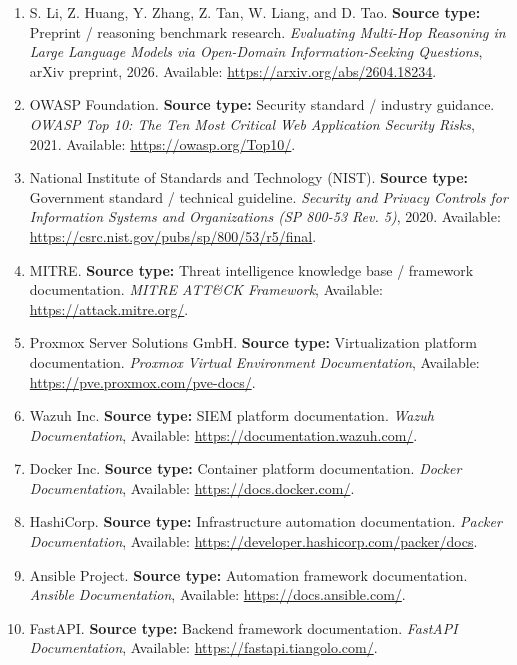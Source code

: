 \begin{enumerate}
\item
S. Li, Z. Huang, Y. Zhang, Z. Tan, W. Liang, and D. Tao.
\textbf{Source type:} Preprint / reasoning benchmark research.
\textit{Evaluating Multi-Hop Reasoning in Large Language Models via Open-Domain Information-Seeking Questions},
arXiv preprint, 2026.
Available: \url{https://arxiv.org/abs/2604.18234}.

\item
OWASP Foundation.
\textbf{Source type:} Security standard / industry guidance.
\textit{OWASP Top 10: The Ten Most Critical Web Application Security Risks},
2021.
Available: \url{https://owasp.org/Top10/}.

\item
National Institute of Standards and Technology (NIST).
\textbf{Source type:} Government standard / technical guideline.
\textit{Security and Privacy Controls for Information Systems and Organizations (SP 800-53 Rev. 5)},
2020.
Available: \url{https://csrc.nist.gov/pubs/sp/800/53/r5/final}.

\item
MITRE.
\textbf{Source type:} Threat intelligence knowledge base / framework documentation.
\textit{MITRE ATT\&CK Framework},
Available: \url{https://attack.mitre.org/}.

\item
Proxmox Server Solutions GmbH.
\textbf{Source type:} Virtualization platform documentation.
\textit{Proxmox Virtual Environment Documentation},
Available: \url{https://pve.proxmox.com/pve-docs/}.

\item
Wazuh Inc.
\textbf{Source type:} SIEM platform documentation.
\textit{Wazuh Documentation},
Available: \url{https://documentation.wazuh.com/}.

\item
Docker Inc.
\textbf{Source type:} Container platform documentation.
\textit{Docker Documentation},
Available: \url{https://docs.docker.com/}.

\item
HashiCorp.
\textbf{Source type:} Infrastructure automation documentation.
\textit{Packer Documentation},
Available: \url{https://developer.hashicorp.com/packer/docs}.

\item
Ansible Project.
\textbf{Source type:} Automation framework documentation.
\textit{Ansible Documentation},
Available: \url{https://docs.ansible.com/}.

\item
FastAPI.
\textbf{Source type:} Backend framework documentation.
\textit{FastAPI Documentation},
Available: \url{https://fastapi.tiangolo.com/}.


\end{enumerate}
